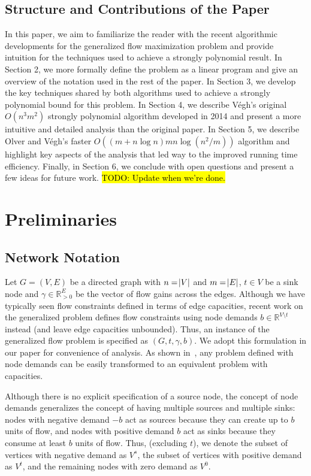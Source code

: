 \documentclass[11pt]{article}
\theoremstyle{definition}
\theoremstyle{definition}
\newcommand{\R}{\mathbb{R}}
\newcommand{\vsrc}{V^{s}}
\newcommand{\vsink}{V^{t}}
\newcommand{\vz}{V^{0}}
\newcommand{\todo}[1]{\hl{TODO: #1}}
\begin{document}
	\subsection{Structure and Contributions of the Paper}
	In this paper, we aim to
	familiarize the reader with the recent algorithmic developments for the
	generalized flow maximization problem and provide intuition for the techniques
	used to achieve a strongly polynomial result. In Section 2, we more formally
	define the problem as a linear program and give an overview of the notation
	used in the rest of the paper. In Section 3, we develop the key techniques
	shared by both algorithms used to achieve a strongly polynomial bound for this
	problem. In Section 4, we describe Végh's original $O(n^3m^2)$ strongly
	polynomial algorithm developed in 2014 and present a more intuitive and
	detailed analysis than the original paper. In Section 5, we describe Olver and
	Végh's faster $O((m + n\log n)mn\log(n^2 / m))$ algorithm and highlight key
	aspects of the analysis that led way to the improved running time efficiency.
	Finally, in Section 6, we conclude with open questions and present a few ideas
	for future work.
	\todo{Update when we're done.}
    
\section{Preliminaries}

	\subsection{Network Notation}
	Let $G=(V,E)$ be a directed graph with $n=\abs{V}$ and $m=\abs{E}$,
	$t \in V$ be a sink node and $\gamma \in \R_{>0}^E$ be the vector of flow gains
	across the edges. Although we have typically seen flow constraints defined in terms of
	edge capacities, recent work on the generalized problem defines flow
	constraints using node demands $b \in \R^{V \setminus t}$ instead (and leave
	edge capacities unbounded). Thus, an instance of the generalized flow problem
	is specified as $(G, t, \gamma, b)$.
	We adopt this formulation in our paper for
	convenience of analysis. As shown in~\cite{Vegh2013}, any problem defined with
	node demands can be easily transformed to an equivalent problem with
	capacities. 

	Although there is no explicit specification of a source node, the concept of
	node demands generalizes the concept of having multiple sources and multiple
	sinks: nodes with negative demand $-b$ act as sources because they can create
	up to $b$ units of flow, and nodes with positive demand $b$ act as sinks 
	because they consume at least $b$ units of flow. Thus, (excluding $t$), we denote the subset of
	vertices with negative demand as $\vsrc$, the subset of vertices with positive
	demand as $\vsink$, and the remaining nodes with zero demand as $\vz$.
\end{document}
